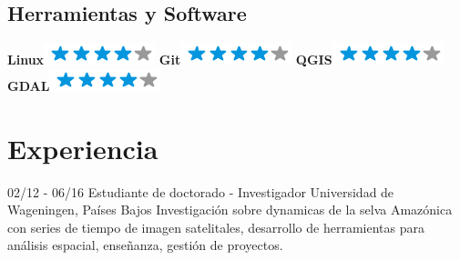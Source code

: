 \documentclass[spanish]{friggeri-cv}
\begin{document}
\begin{aside}
  \section{Herramientas y Software}
    \textbf{Linux}\includegraphics[scale=0.40]{img/4stars.png}
    \textbf{Git}\includegraphics[scale=0.40]{img/4stars.png}
    \textbf{QGIS}\includegraphics[scale=0.40]{img/4stars.png}
    \textbf{GDAL}\includegraphics[scale=0.40]{img/4stars.png}
    ~
\end{aside}


\section{Experiencia}
\begin{entrylist}
  \entry
    {02/12 - 06/16}
    {Estudiante de doctorado - Investigador}
    {Universidad de Wageningen, Países Bajos}
    {Investigación sobre dynamicas de la selva Amazónica con series de tiempo de imagen satelitales, desarrollo de herramientas para análisis espacial, enseñanza, gestión de proyectos.\\}
 
\end{entrylist}
\end{document}
